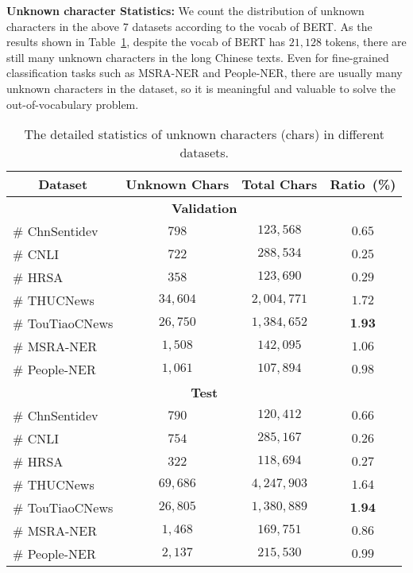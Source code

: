\noindent\textbf{Unknown character Statistics: } We count the distribution of unknown characters in the above 7 datasets according to the vocab of BERT. As the results shown in Table~\ref{tab:exp5}, despite the vocab of BERT has $21,128$ tokens, there are still many unknown characters in the long Chinese texts. Even for fine-grained classification tasks such as MSRA-NER and People-NER, there are usually many unknown characters in the dataset, so it is meaningful and valuable to solve the out-of-vocabulary problem. 


\begin{table}[t]
\renewcommand\arraystretch{1.1}
\small
\centering
 \caption{The detailed statistics of unknown characters (chars) in different datasets.}
\label{tab:exp5}
\begin{tabular}{lccc}
\toprule[0.9pt]
\multicolumn{1}{c}{\textbf{Dataset}} &  \multicolumn{1}{c}{\textbf{Unknown Chars}} & \multicolumn{1}{c}{\textbf{Total Chars}} &
\multicolumn{1}{c}{\textbf{Ratio~(\%)}}\\\midrule[0.7pt]
\multicolumn{4}{c}{\textbf{Validation}} \\\hline
\# ChnSentidev & $798$ & $123,568$ & $0.65$\\
\# CNLI & $722$ & $288,534$ & $0.25$\\
\# HRSA & $358$ & $123,690$ & $0.29$\\
\# THUCNews & $34,604$ & $2,004,771$ & $1.72$\\
\# TouTiaoCNews & $26,750$ & $1,384,652$ & $\textbf{1.93}$\\
\# MSRA-NER & $1,508$ & $142,095$ & $1.06$\\
\# People-NER & $1,061$ & $107,894$ & $0.98$\\
\midrule[0.7pt]
\multicolumn{4}{c}{\textbf{Test}} \\\hline
\# ChnSentidev & $790$ & $120,412$ & $0.66$\\
\# CNLI & $754$ & $285,167$ & $0.26$\\
\# HRSA & $322$ & $118,694$ & $0.27$\\
\# THUCNews & $69,686$ & $4,247,903$ & $1.64$\\
\# TouTiaoCNews & $26,805$ & $1,380,889$ & $\textbf{1.94}$\\
\# MSRA-NER & $1,468$ & $169,751$ & $0.86$\\
\# People-NER & $2,137$ & $215,530$ & $0.99$\\
\bottomrule[0.9pt]
\end{tabular}
\end{table}

